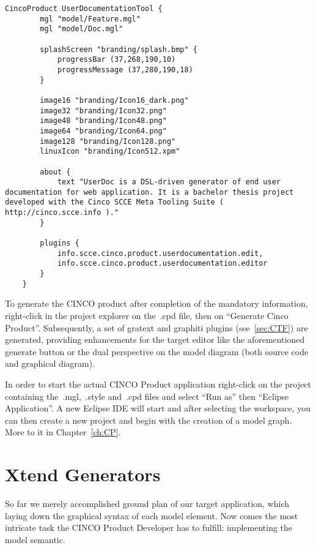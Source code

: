 \begin{lstlisting}[language=MGL, caption={UserDocumentationTool.cpd}]
    CincoProduct UserDocumentationTool {
        mgl "model/Feature.mgl"
        mgl "model/Doc.mgl"
        
        splashScreen "branding/splash.bmp" {
            progressBar (37,268,190,10)
            progressMessage (37,280,190,18)
        }
    
        image16 "branding/Icon16_dark.png"
        image32 "branding/Icon32.png"
        image48 "branding/Icon48.png"
        image64 "branding/Icon64.png"
        image128 "branding/Icon128.png"
        linuxIcon "branding/Icon512.xpm"
	
        about {
            text "UserDoc is a DSL-driven generator of end user documentation for web application. It is a bachelor thesis project developed with the Cinco SCCE Meta Tooling Suite ( http://cinco.scce.info )."
        }

        plugins {
            info.scce.cinco.product.userdocumentation.edit,
            info.scce.cinco.product.userdocumentation.editor
        }
    }
\end{lstlisting}

To generate the CINCO product after completion of the mandatory information, right-click in the project explorer on the~.cpd file, then on ``Generate Cinco Product''. Subsequently, a set of gratext and graphiti plugins (see~\ref{sec:CTF}) are generated, providing enhancements for the target editor like the aforementioned generate button or the dual perspective on the model diagram (both source code and graphical diagram). 

In order to start the actual CINCO Product application right-click on the project containing the~.mgl,~.style and~.cpd files and select ``Run as'' then ``Eclipse Application''. A new Eclipse IDE will start and after selecting the workspace, you can then create a new project and begin with the creation of a model graph. More to it in Chapter~\ref{ch:CP}.

\section{Xtend Generators}\label{sec:GEN}

So far we merely accomplished ground plan of our target application, which laying down the graphical syntax of each model element. Now comes the most intricate task the CINCO Product Developer has to fulfill: implementing the model semantic. 

